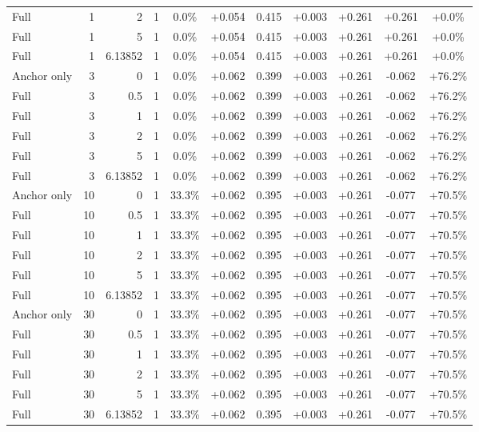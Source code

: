\begin{table}[htbp]
\begin{tabular}{lrrrccccccc}
Full & 1 & 2 & 1 & 0.0\% & +0.054 & 0.415 & +0.003 & +0.261 & +0.261 & +0.0\% \\
Full & 1 & 5 & 1 & 0.0\% & +0.054 & 0.415 & +0.003 & +0.261 & +0.261 & +0.0\% \\
Full & 1 & 6.13852 & 1 & 0.0\% & +0.054 & 0.415 & +0.003 & +0.261 & +0.261 & +0.0\% \\
Anchor only & 3 & 0 & 1 & 0.0\% & +0.062 & 0.399 & +0.003 & +0.261 & -0.062 & +76.2\% \\
Full & 3 & 0.5 & 1 & 0.0\% & +0.062 & 0.399 & +0.003 & +0.261 & -0.062 & +76.2\% \\
Full & 3 & 1 & 1 & 0.0\% & +0.062 & 0.399 & +0.003 & +0.261 & -0.062 & +76.2\% \\
Full & 3 & 2 & 1 & 0.0\% & +0.062 & 0.399 & +0.003 & +0.261 & -0.062 & +76.2\% \\
Full & 3 & 5 & 1 & 0.0\% & +0.062 & 0.399 & +0.003 & +0.261 & -0.062 & +76.2\% \\
Full & 3 & 6.13852 & 1 & 0.0\% & +0.062 & 0.399 & +0.003 & +0.261 & -0.062 & +76.2\% \\
Anchor only & 10 & 0 & 1 & 33.3\% & +0.062 & 0.395 & +0.003 & +0.261 & -0.077 & +70.5\% \\
Full & 10 & 0.5 & 1 & 33.3\% & +0.062 & 0.395 & +0.003 & +0.261 & -0.077 & +70.5\% \\
Full & 10 & 1 & 1 & 33.3\% & +0.062 & 0.395 & +0.003 & +0.261 & -0.077 & +70.5\% \\
Full & 10 & 2 & 1 & 33.3\% & +0.062 & 0.395 & +0.003 & +0.261 & -0.077 & +70.5\% \\
Full & 10 & 5 & 1 & 33.3\% & +0.062 & 0.395 & +0.003 & +0.261 & -0.077 & +70.5\% \\
Full & 10 & 6.13852 & 1 & 33.3\% & +0.062 & 0.395 & +0.003 & +0.261 & -0.077 & +70.5\% \\
Anchor only & 30 & 0 & 1 & 33.3\% & +0.062 & 0.395 & +0.003 & +0.261 & -0.077 & +70.5\% \\
Full & 30 & 0.5 & 1 & 33.3\% & +0.062 & 0.395 & +0.003 & +0.261 & -0.077 & +70.5\% \\
Full & 30 & 1 & 1 & 33.3\% & +0.062 & 0.395 & +0.003 & +0.261 & -0.077 & +70.5\% \\
Full & 30 & 2 & 1 & 33.3\% & +0.062 & 0.395 & +0.003 & +0.261 & -0.077 & +70.5\% \\
Full & 30 & 5 & 1 & 33.3\% & +0.062 & 0.395 & +0.003 & +0.261 & -0.077 & +70.5\% \\
Full & 30 & 6.13852 & 1 & 33.3\% & +0.062 & 0.395 & +0.003 & +0.261 & -0.077 & +70.5\% \\

\end{tabular}
\end{table}

